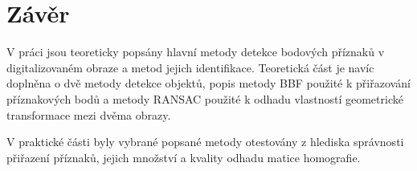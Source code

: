 

\chapter{Závěr}

V práci jsou teoreticky popsány hlavní metody detekce bodových příznaků v digitalizovaném obraze a metod jejich identifikace.
Teoretická část je navíc doplněna o dvě metody detekce objektů, popis metody BBF použité k přiřazování příznakových bodů
a metody RANSAC použité k odhadu vlastností geometrické transformace mezi dvěma obrazy.

V praktické části byly vybrané popsané metody otestovány z hlediska správnosti přiřazení příznaků, jejich množství
a kvality odhadu matice homografie.